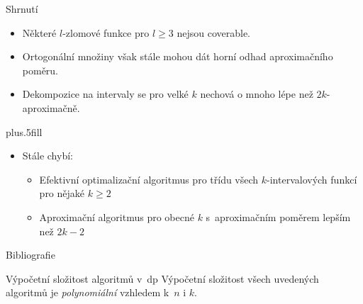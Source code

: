 \documentclass{beamer}
\theoremstyle{remark}
\begin{document}
\begin{frame}{Shrnutí}

  \begin{itemize}
  \item
    Některé $l$-zlomové funkce pro $l \geq 3$ nejsou coverable.
  \item
    Ortogonální množiny však stále mohou dát horní odhad aproximačního poměru.
  \item
    Dekompozice na intervaly se pro velké $k$ nechová o mnoho lépe než $2k$-aproximačně.
  \end{itemize}
  
  \vskip0pt plus.5fill
  \begin{itemize}
  \item
    Stále chybí:
    \begin{itemize}
    \item
      Efektivní optimalizační algoritmus pro třídu všech $k$-intervalových funkcí pro nějaké $k \geq 2$
    \item
      Aproximační algoritmus pro obecné $k$ s~aproximačním poměrem lepším než $2k-2$
    \end{itemize}
  \end{itemize}
\end{frame}

\begin{frame}{Bibliografie}



\end{frame}

\begin{frame}{Výpočetní složitost algoritmů v~\acrshort{dp}}
Výpočetní složitost všech uvedených algoritmů je \emph{polynomiální} vzhledem k~$n$ i $k$.
\end{frame}
\end{document}
